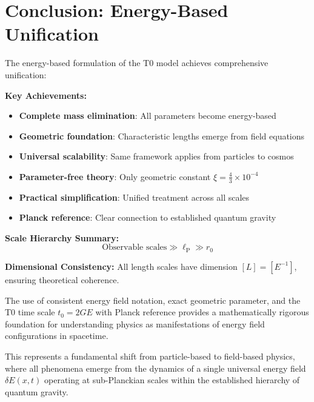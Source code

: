\documentclass[12pt,a4paper]{report}
\newcommand{\lP}{\ell_{\text{P}}}         %
\newcommand{\rzero}{r_0}                  %
\newcommand{\tzero}{t_0}                  %
\begin{document}
	\section{Conclusion: Energy-Based Unification}\label{sec:conclusion_energy_unification}
	
	The energy-based formulation of the T0 model achieves comprehensive unification:
	
	\textbf{Key Achievements:}
	\begin{itemize}
		\item \textbf{Complete mass elimination}: All parameters become energy-based
		\item \textbf{Geometric foundation}: Characteristic lengths emerge from field equations
		\item \textbf{Universal scalability}: Same framework applies from particles to cosmos
		\item \textbf{Parameter-free theory}: Only geometric constant $\xi = \frac{4}{3} \times 10^{-4}$
		\item \textbf{Practical simplification}: Unified treatment across all scales
		\item \textbf{Planck reference}: Clear connection to established quantum gravity
	\end{itemize}
	
	\textbf{Scale Hierarchy Summary:}
	\begin{equation}
		\text{Observable scales} \gg \lP \gg \rzero
	\end{equation}
	
	\textbf{Dimensional Consistency:}
	All length scales have dimension $[L] = [E^{-1}]$, ensuring theoretical coherence.
	
	The use of consistent energy field notation, exact geometric parameter, and the T0 time scale $\tzero = 2GE$ with Planck reference provides a mathematically rigorous foundation for understanding physics as manifestations of energy field configurations in spacetime.
	
	This represents a fundamental shift from particle-based to field-based physics, where all phenomena emerge from the dynamics of a single universal energy field $\delta E(x,t)$ operating at sub-Planckian scales within the established hierarchy of quantum gravity.
\end{document}
